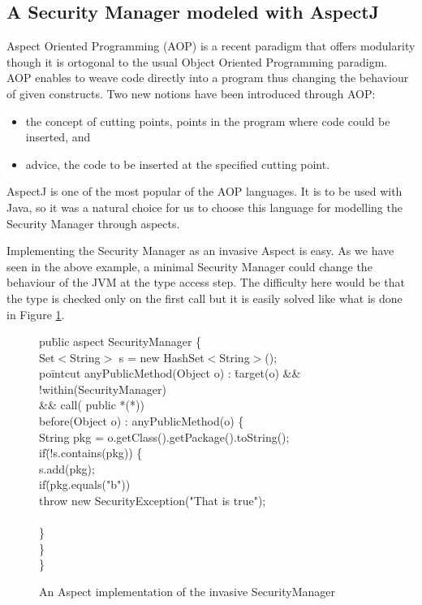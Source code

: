 \subsection{A Security Manager modeled with AspectJ}
Aspect Oriented Programming (AOP) is a recent paradigm that offers
modularity though it is ortogonal to the usual Object Oriented
Programming paradigm. AOP enables to weave code directly into a
program thus changing the behaviour of given constructs. Two new
notions have been introduced through AOP:
\begin{itemize}
\item the concept of cutting points, points in the program where code
could be inserted, and
\item advice, the code to be inserted at the specified cutting point.
\end{itemize}
AspectJ is one of the most popular of the AOP languages. It is to be
used with Java, so it was a natural choice for us to choose this
language for modelling the Security Manager through aspects.

Implementing the Security Manager as an invasive Aspect is easy.  As
we have seen in the above example, a minimal Security Manager could
change the behaviour of the JVM at the type access step. The
difficulty here would be that the type is checked only on the first
call but it is easily solved like what is done in Figure \ref{base_implem}.
%
\begin{figure}
\bcode
pu\=blic aspect SecurityManager \{\+\\

Set$<$String$>$ s = new HashSet$<$String$>$();\\
po\=intcut anyPublicMethod(Object o) : \=target(o) \&\& !within(SecurityManager)\+ \\
           \>\&\& call( public *(*))\-\\
before(Object o) : anyPublicMethod(o) \{\+\\
    String pkg = o.getClass().getPackage().toString();\\
    if\=(!s.contains(pkg)) \{\+\\     
       s.add(pkg);\\
       if\=(pkg.equals("b"))\\
           \>throw new SecurityException("That is true");\\\-\\ 
    \}\-\\
\}\-\\
\}
\ecode
\caption{An Aspect implementation of the invasive SecurityManager}
\label{base_implem}
\end{figure}


